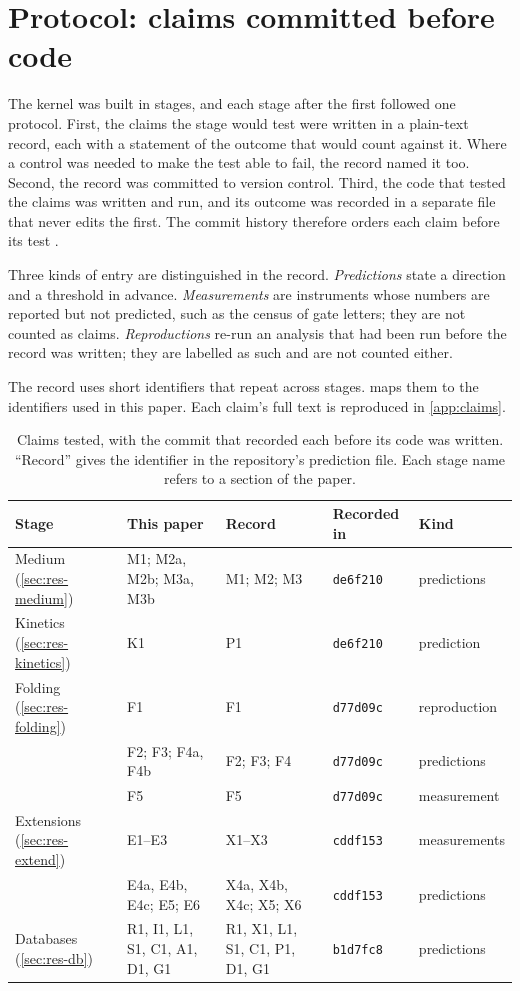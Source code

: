 \section{Protocol: claims committed before code}
\label{sec:protocol}

The kernel was built in stages, and each stage after the first followed one protocol.
First, the claims the stage would test were written in a plain-text record, each with a statement of the outcome that would count against it.
Where a control was needed to make the test able to fail, the record named it too.
Second, the record was committed to version control.
Third, the code that tested the claims was written and run, and its outcome was recorded in a separate file that never edits the first.
The commit history therefore orders each claim before its test \citep{nosek2018preregistration}.

Three kinds of entry are distinguished in the record.
\emph{Predictions} state a direction and a threshold in advance.
\emph{Measurements} are instruments whose numbers are reported but not predicted, such as the census of gate letters; they are not counted as claims.
\emph{Reproductions} re-run an analysis that had been run before the record was written; they are labelled as such and are not counted either.

The record uses short identifiers that repeat across stages.
 maps them to the identifiers used in this paper.
Each claim's full text is reproduced in \cref{app:claims}.

\begin{table}[t]
\centering
\caption{Claims tested, with the commit that recorded each before its code was written.
``Record'' gives the identifier in the repository's prediction file.
Each stage name refers to a section of the paper.}
\label{tab:ids}
\footnotesize
\setlength{\tabcolsep}{4pt}
\begin{tabular}{@{}lp{3.6cm}p{3.4cm}ll@{}}
\toprule
Stage & This paper & Record & Recorded in & Kind \\
\midrule
Medium (\cref{sec:res-medium}) & M1; M2a, M2b; M3a, M3b & M1; M2; M3 & \texttt{de6f210} & predictions \\
Kinetics (\cref{sec:res-kinetics}) & K1 & P1 & \texttt{de6f210} & prediction \\
Folding (\cref{sec:res-folding}) & F1 & F1 & \texttt{d77d09c} & reproduction \\
 & F2; F3; F4a, F4b & F2; F3; F4 & \texttt{d77d09c} & predictions \\
 & F5 & F5 & \texttt{d77d09c} & measurement \\
Extensions (\cref{sec:res-extend}) & E1--E3 & X1--X3 & \texttt{cddf153} & measurements \\
 & E4a, E4b, E4c; E5; E6 & X4a, X4b, X4c; X5; X6 & \texttt{cddf153} & predictions \\
Databases (\cref{sec:res-db}) & R1, I1, L1, S1, C1, A1, D1, G1 & R1, X1, L1, S1, C1, P1, D1, G1 & \texttt{b1d7fc8} & predictions \\
\bottomrule
\end{tabular}
\end{table}

